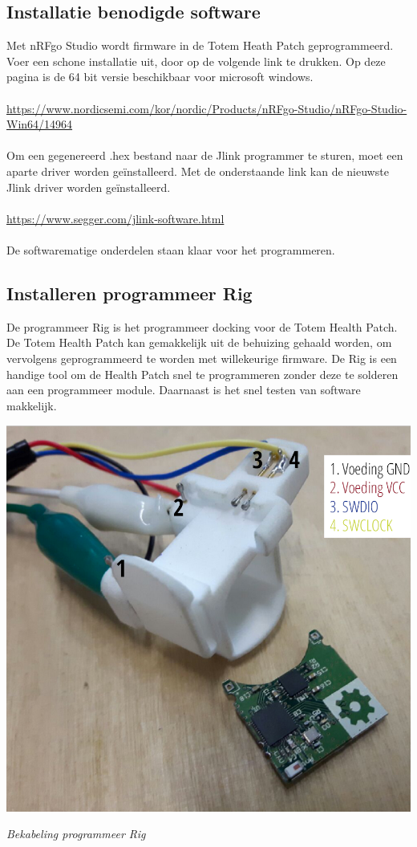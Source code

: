 \documentclass[conference]{IEEEtran}
\begin{document}
\subsection{Installatie benodigde software}
Met nRFgo Studio wordt firmware in de Totem Heath Patch geprogrammeerd. Voer een schone installatie uit, door op de volgende link te drukken. Op deze pagina is de 64 bit versie beschikbaar voor microsoft windows. \\\\\url{https://www.nordicsemi.com/kor/nordic/Products/nRFgo-Studio/nRFgo-Studio-Win64/14964}\\\\Om een gegenereerd .hex bestand naar de Jlink programmer te sturen, moet een aparte driver worden geïnstalleerd. Met de onderstaande link kan de nieuwste Jlink driver worden geïnstalleerd.\\\\\url{https://www.segger.com/jlink-software.html}\\\\
De softwarematige onderdelen staan klaar voor het programmeren.

\subsection{Installeren programmeer Rig}
De programmeer Rig is het programmeer docking voor de Totem Health Patch. De Totem Health Patch kan gemakkelijk uit de behuizing gehaald worden, om vervolgens geprogrammeerd te worden met willekeurige firmware. De Rig is een handige tool om de Health Patch snel te programmeren zonder deze te solderen aan een programmeer module. Daarnaast is het snel testen van software makkelijk.

\begin{center}
    \includegraphics[scale=0.45]{rig1}
    \begin{minipage}{0.6\textwidth}
    \footnotesize
    \emph{Bekabeling programmeer Rig}
    \end{minipage}
\end{center}
\end{document}
